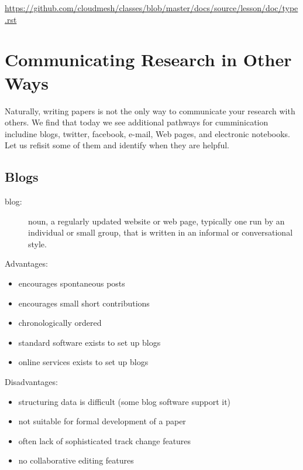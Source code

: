 \begin{fileremark}\url{https://github.com/cloudmesh/classes/blob/master/docs/source/lesson/doc/type.rst}\end{fileremark}
\section{Communicating Research in Other Ways}\label{communicating-research}

Naturally, writing papers is not the only way to communicate your
research with others. We find that today we see additional pathways
for cumminication includine blogs, twitter, facebook, e-mail, Web
pages, and electronic notebooks. Let us refisit some of them and
identify when they are helpful.

\subsection{Blogs}\label{blogs}

\begin{description}
\item[blog:]
noun, a regularly updated website or web page, typically one run by an
individual or small group, that is written in an informal or
conversational style.
\end{description}

Advantages:

\begin{itemize}
\tightlist
\item
  encourages spontaneous posts
\item
  encourages small short contributions
\item
  chronologically ordered
\item
  standard software exists to set up blogs
\item
  online services exists to set up blogs
\end{itemize}

Disadvantages:

\begin{itemize}
\tightlist
\item
  structuring data is difficult (some blog software support it)
\item
  not suitable for formal development of a paper
\item
  often lack of sophisticated track change features
\item
  no collaborative editing features
\end{itemize}

